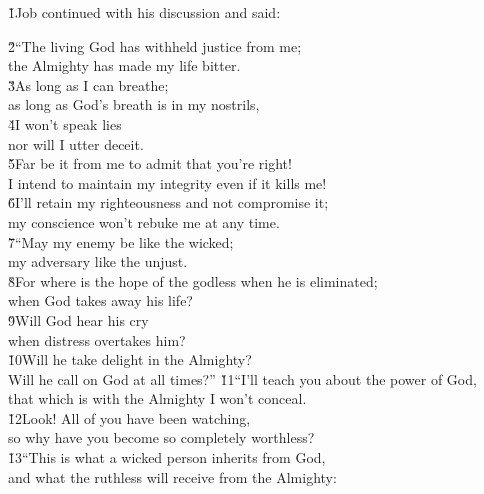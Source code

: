 \v{1}Job continued with his discussion and said:

\begin{poetry}
\poeml \v{2}``The living God has withheld justice from me; \\
\poemll    the Almighty has made my life bitter. \\
\poeml \v{3}As long as I can breathe; \\
\poemll    as long as God's breath is in my nostrils, \\
\poeml \v{4}I won't speak lies \\
\poemll    nor will I utter deceit. \\
\poeml \v{5}Far be it from me to admit that you're right! \\
\poemll    I intend to maintain my integrity even if it kills me! \\
\poeml \v{6}I'll retain my righteousness and not compromise it; \\
\poemll    my conscience won't rebuke me at any time. \\
\poeml \v{7}``May my enemy be like the wicked; \\
\poemll    my adversary like the unjust. \\
\poeml \v{8}For where is the hope of the godless when he is eliminated; \\
\poemll    when God takes away his life? \\
\poeml \v{9}Will God hear his cry \\
\poemll    when distress overtakes him? \\
\poeml \v{10}Will he take delight in the Almighty? \\
\poemll    Will he call on God at all times?''
\poeml \v{11}``I'll teach you about the power of God, \\
\poemll    that which is with the Almighty I won't conceal. \\
\poeml \v{12}Look! All of you have been watching, \\
\poemll    so why have you become so completely worthless? \\
\poeml \v{13}``This is what a wicked person inherits from God, \\
\poemll    and what the ruthless will receive from the Almighty: \\

\end{poetry}
